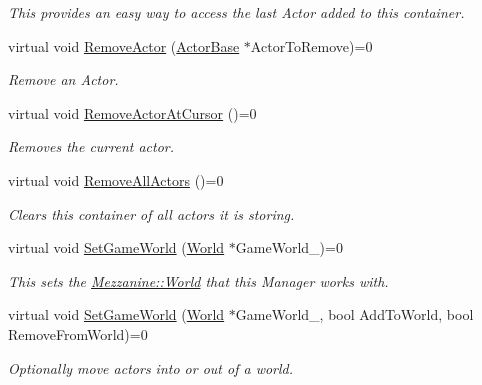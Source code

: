 \begin{DoxyCompactItemize}
\begin{DoxyCompactList}\small\item\em This provides an easy way to access the last Actor added to this container. \item\end{DoxyCompactList}\item 
virtual void \hyperlink{classMezzanine_1_1ActorContainerBase_a25052e0fc2dcf1eab9cfc909d68de60c}{RemoveActor} (\hyperlink{classMezzanine_1_1ActorBase}{ActorBase} $\ast$ActorToRemove)=0
\begin{DoxyCompactList}\small\item\em Remove an Actor. \item\end{DoxyCompactList}\item 
virtual void \hyperlink{classMezzanine_1_1ActorContainerBase_a00fa640707739e2a94b91a09873d7dcc}{RemoveActorAtCursor} ()=0
\begin{DoxyCompactList}\small\item\em Removes the current actor. \item\end{DoxyCompactList}\item 
\hypertarget{classMezzanine_1_1ActorContainerBase_aca54c6e86a84ec84adb0b648309a6fd4}{
virtual void \hyperlink{classMezzanine_1_1ActorContainerBase_aca54c6e86a84ec84adb0b648309a6fd4}{RemoveAllActors} ()=0}
\label{classMezzanine_1_1ActorContainerBase_aca54c6e86a84ec84adb0b648309a6fd4}

\begin{DoxyCompactList}\small\item\em Clears this container of all actors it is storing. \item\end{DoxyCompactList}\item 
virtual void \hyperlink{classMezzanine_1_1ActorContainerBase_aed532e5416af4c896a85a78b707aeee9}{SetGameWorld} (\hyperlink{classMezzanine_1_1World}{World} $\ast$GameWorld\_\-)=0
\begin{DoxyCompactList}\small\item\em This sets the \hyperlink{classMezzanine_1_1World}{Mezzanine::World} that this Manager works with. \item\end{DoxyCompactList}\item 
virtual void \hyperlink{classMezzanine_1_1ActorContainerBase_a5dd1ea660dbbcb39d36e702c4e393f30}{SetGameWorld} (\hyperlink{classMezzanine_1_1World}{World} $\ast$GameWorld\_\-, bool AddToWorld, bool RemoveFromWorld)=0
\begin{DoxyCompactList}\small\item\em Optionally move actors into or out of a world. \item\end{DoxyCompactList}\end{DoxyCompactItemize}

